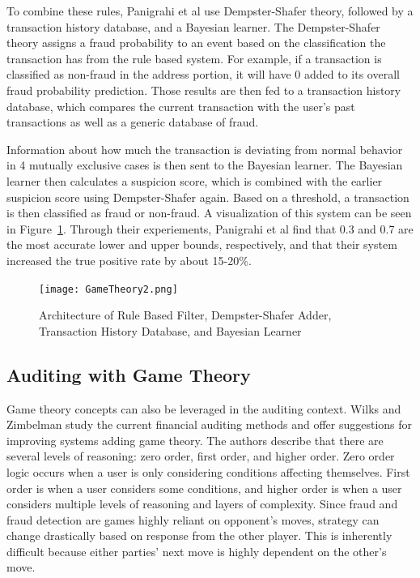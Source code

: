 \documentclass[midd]{thesis}
\begin{document}
To combine these rules, Panigrahi et al use Dempster-Shafer theory, followed by a transaction history database, and a Bayesian learner. The Dempster-Shafer theory assigns a fraud probability to an event based on the classification the transaction has from the rule based system. For example, if a transaction is classified as non-fraud in the address portion, it will have 0 added to its overall fraud probability prediction. Those results are then fed to a transaction history database, which compares the current transaction with the user's past transactions as well as a generic database of fraud. 

Information about how much the transaction is deviating from normal behavior in 4 mutually exclusive cases is then sent to the Bayesian learner. The Bayesian learner then calculates a suspicion score, which is combined with the earlier suspicion score using Dempster-Shafer again. Based on a threshold, a transaction is then classified as fraud or non-fraud. A visualization of this system can be seen in Figure~\ref{fig:gametheory2}. Through their experiements, Panigrahi et al find that 0.3 and 0.7 are the most accurate lower and upper bounds, respectively, and that their system increased the true positive rate by about 15-20\%. 



\begin{figure} \centering
  \texttt{[image: GameTheory2.png]}
  \caption{Architecture of Rule Based Filter, Dempster-Shafer Adder, Transaction History Database, and Bayesian Learner}
  \label{fig:gametheory2}
\end{figure}


\subsection{Auditing with Game Theory}

Game theory concepts can also be leveraged in the auditing context. Wilks and Zimbelman study the current financial auditing methods and offer suggestions for improving systems adding game theory. The authors describe that there are several levels of reasoning: zero order, first order, and higher order. Zero order logic occurs when a user is only considering conditions affecting themselves. First order is when a user considers some conditions, and higher order is when a user considers multiple levels of reasoning and layers of complexity. Since fraud and fraud detection are games highly reliant on opponent's moves, strategy can change drastically based on response from the other player. This is inherently difficult because either parties' next move is highly dependent on the other's move. 
\end{document}
